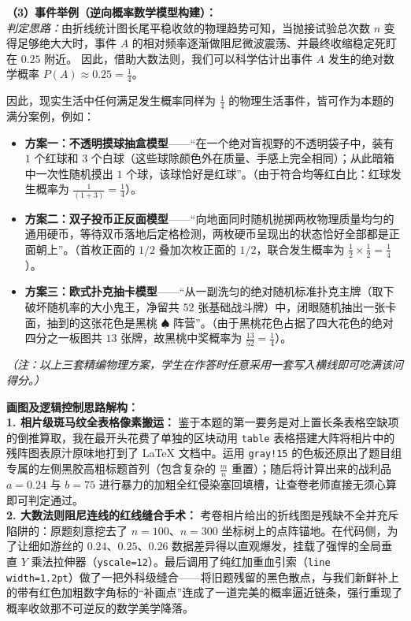 \vspace{0.4cm}
\textbf{（3）事件举例（逆向概率数学模型构建）：} \\
\textit{判定思路：}由折线统计图长尾平稳收敛的物理趋势可知，当抛接试验总次数 $n$ 变得足够绝大大时，事件 $A$ 的相对频率逐渐做阻尼微波震荡、并最终收缩稳定死盯在 $0.25$ 附近。
因此，借助大数法则，我们可以科学估计出事件 $A$ 发生的绝对数学概率 $P(A) \approx 0.25 = \frac{1}{4}$。

因此，现实生活中任何满足发生概率同样为 $\frac{1}{4}$ 的物理生活事件，皆可作为本题的满分案例，例如：
\begin{itemize}
    \item \textbf{方案一：不透明摸球抽盒模型}——“在一个绝对盲视野的不透明袋子中，装有 $1$ 个红球和 $3$ 个白球（这些球除颜色外在质量、手感上完全相同）；从此暗箱中一次性随机摸出 $1$ 个球，该球恰好是红球”。（由于符合均等红白比：红球发生概率为 $\frac{1}{(1+3)} = \frac{1}{4}$）。
    \item \textbf{方案二：双子投币正反面模型}——“向地面同时随机抛掷两枚物理质量均匀的通用硬币，等待双币落地后定格检测，两枚硬币呈现出的状态恰好全部都是正面朝上”。（首枚正面的 $1/2$ 叠加次枚正面的 $1/2$，联合发生概率为 $\frac{1}{2} \times \frac{1}{2} = \frac{1}{4}$）。
    \item \textbf{方案三：欧式扑克抽卡模型}——“从一副洗匀的绝对随机标准扑克主牌（取下破坏随机率的大小鬼王，净留共 $52$ 张基础战斗牌）中，闭眼随机抽出一张卡面，抽到的这张花色是黑桃 $\spadesuit$ 阵营”。（由于黑桃花色占据了四大花色的绝对四分之一板图共 $13$ 张牌，故黑桃中奖概率为 $\frac{13}{52} = \frac{1}{4}$）。
\end{itemize}
\textit{（注：以上三套精编物理方案，学生在作答时任意采用一套写入横线即可吃满该问得分。）}

\vspace{0.4cm}
{\small\color{blue!70!black}
\textbf{画图及逻辑控制思路解构：}\\
\textbf{1. 相片级斑马纹全表格像素搬运：} 鉴于本题的第一要务是对上置长条表格空缺项的倒推算取，我在最开头花费了单独的区块动用 \texttt{table} 表格搭建大阵将相片中的残阵图表原汁原味地打到了 LaTeX 文档中。运用 \texttt{gray!15} 的色板还原出了题目组专属的左侧黑胶高粗标题首列（包含复杂的 $\frac{m}{n}$ 重置）；随后将计算出来的战利品 $a=0.24$ 与 $b=75$ 进行暴力的加粗全红侵染塞回填槽，让查卷老师直接无须心算即可判定通过。\\
\textbf{2. 大数法则阻尼连线的红线缝合手术：} 考卷相片给出的折线图是残缺不全并充斥陷阱的：原题刻意挖去了 $n=100$、$n=300$ 坐标树上的点阵锚地。在代码侧，为了让细如游丝的 $0.24、0.25、0.26$ 数据差异得以直观爆发，挂载了强悍的全局垂直 $Y$ 乘法拉伸器（\texttt{yscale=12}）。最后调用了纯红加重血引索（\texttt{line width=1.2pt}）做了一把外科级缝合——将旧题残留的黑色散点，与我们新鲜补上的带有红色加粗数字角标的“补画点”连成了一道完美的概率逼近链条，强行重现了概率收敛那不可逆反的数学美学降落。
}

